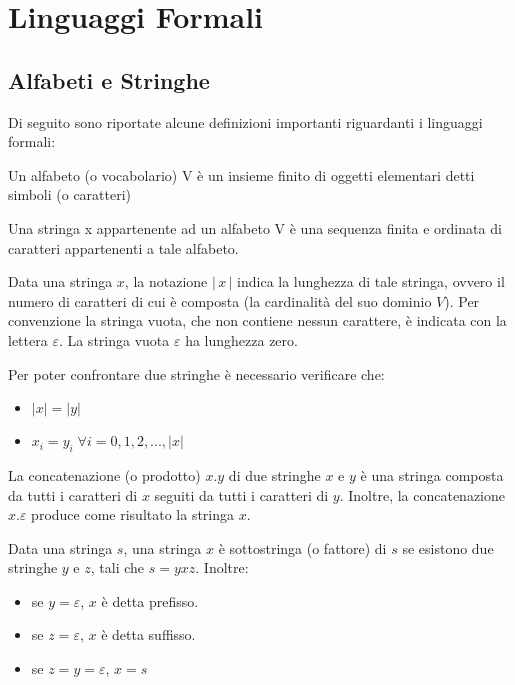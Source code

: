 \chapter{Linguaggi Formali}

  \section{Alfabeti e Stringhe}
  Di seguito sono riportate alcune definizioni importanti riguardanti i linguaggi formali:
  \begin{definition}[Alfabeto]
    Un alfabeto (o vocabolario) V è un insieme finito di oggetti elementari detti simboli (o caratteri)
  \end{definition} 

  \begin{definition} [Stringa]
    Una stringa x appartenente ad un alfabeto V è una sequenza finita e ordinata di caratteri appartenenti a tale alfabeto.
  \end{definition}

  Data una stringa \(x\), la notazione \(|\,x\,|\) indica la lunghezza di tale stringa, ovvero il numero di caratteri di cui è composta (la cardinalità del suo dominio \(V\)). Per convenzione la stringa vuota, che non contiene nessun carattere, è indicata con la lettera \(\varepsilon\). La stringa vuota \(\varepsilon\) ha lunghezza zero. 

  Per poter confrontare due stringhe è necessario verificare che:
  \begin{itemize}
    \item \(|x| = |y|\)
    \item \(x_i = y_i\; \forall i=0,1,2,...,|x|\)
  \end{itemize}

  La concatenazione (o prodotto) \(x.y\) di due stringhe \(x\) e \(y\) è una stringa composta da tutti i caratteri di \(x\) seguiti da tutti i caratteri di \(y\). Inoltre, la concatenazione \(x.\varepsilon\) produce come risultato la stringa \(x\).

  Data una stringa \(s\), una stringa \(x\) è sottostringa (o fattore) di \(s\) se esistono due stringhe \(y\) e \(z\), tali che \(s=yxz\). Inoltre:
  \begin{itemize}
    \item se \(y=\varepsilon\), \(x\) è detta prefisso.
    \item se \(z=\varepsilon\), \(x\) è detta suffisso.
    \item se \(z=y=\varepsilon\), \(x=s\)
  \end{itemize}

